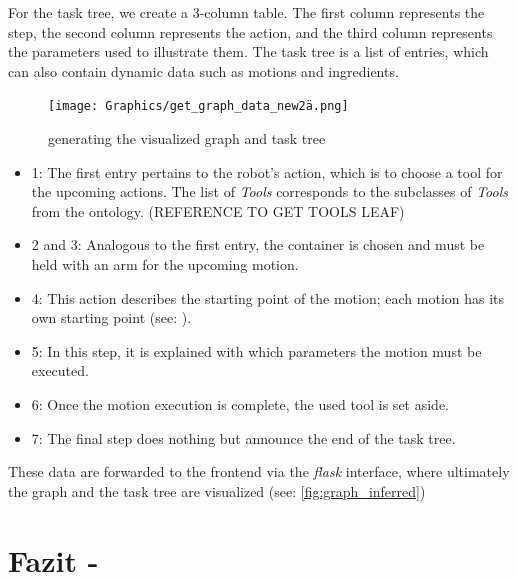 For the task tree, we create a 3-column table. The first column represents the step, the second column represents the action, and the third column represents the parameters used to illustrate them. The task tree is a list of entries, which can also contain dynamic data such as motions and ingredients.
\begin{figure}[H]
    \texttt{[image: Graphics/get\_graph\_data\_new2ä.png]}
    \caption{generating the visualized graph and task tree}
\end{figure}

\begin{itemize}
    \item 1: The first entry pertains to the robot's action, which is to choose a tool for the upcoming actions. The list of \textit{Tools} corresponds to the subclasses of \textit{Tools} from the ontology. (REFERENCE TO GET TOOLS LEAF)
    \item 2 and 3: Analogous to the first entry, the container is chosen and must be held with an arm for the upcoming motion.
    \item 4: This action describes the starting point of the motion; each motion has its own starting point (see: ).
    \item 5: In this step, it is explained with which parameters the motion must be executed.
    \item 6: Once the motion execution is complete, the used tool is set aside.
    \item 7: The final step does nothing but announce the end of the task tree.
    \end{itemize}

These data are forwarded to the frontend via the \textit{flask} interface, where ultimately the graph and the task tree are visualized (see: \ref{fig:graph_inferred})
\section*{Fazit -}